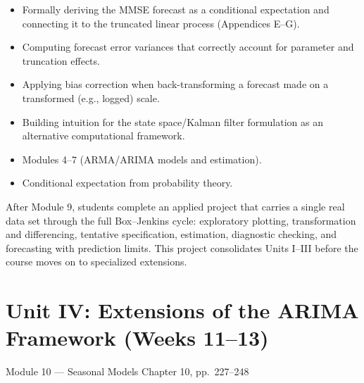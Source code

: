 \documentclass[11pt]{article}
\begin{document}
\begin{difficult}
\begin{itemize}
  \item Formally deriving the MMSE forecast as a conditional expectation and connecting it to the truncated linear process (Appendices E--G).
  \item Computing forecast error variances that correctly account for parameter and truncation effects.
  \item Applying bias correction when back-transforming a forecast made on a transformed (e.g., logged) scale.
  \item Building intuition for the state space/Kalman filter formulation as an alternative computational framework.
\end{itemize}
\end{difficult}

\begin{prereqs}
\begin{itemize}
  \item Modules 4--7 (ARMA/ARIMA models and estimation).
  \item Conditional expectation from probability theory.
\end{itemize}
\end{prereqs}

\vspace{10pt}
\begin{tcolorbox}[enhanced, colback=panelgray, colframe=unitblue!60, arc=2pt, boxrule=0.6pt, title={Checkpoint: Midterm Applied Project}, coltitle=white, colbacktitle=unitblue, fonttitle=\bfseries]
\small After Module 9, students complete an applied project that carries a single real data set through the full Box--Jenkins cycle: exploratory plotting, transformation and differencing, tentative specification, estimation, diagnostic checking, and forecasting with prediction limits. This project consolidates Units I--III before the course moves on to specialized extensions.
\end{tcolorbox}

\newpage
\section{Unit IV: Extensions of the ARIMA Framework (Weeks 11--13)}

\begin{moduletitle}{Module 10 --- Seasonal Models}
\small Chapter 10, pp.\ 227--248
\end{moduletitle}
\end{document}
